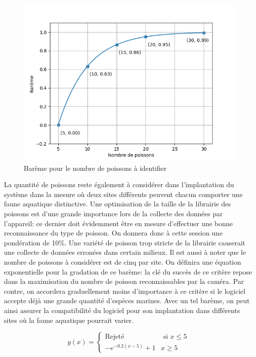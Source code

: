 \begin{figure}[!htb]
    \centering
    \includegraphics[width=0.9\linewidth]{fig/bareme_identification.png}
    \caption{Barème pour le nombre de poissons à identifier}
    \label{fig:bareme_identification}
\end{figure}

La quantité de poissons reste également à considérer dans l'implantation du système dans la mesure où deux sites différents peuvent chacun comporter une faune aquatique distinctive. Une optimisation de la taille de la librairie des poissons est d'une grande importance lors de la collecte des données par l'appareil: ce dernier doit évidemment être en mesure d'effectuer une bonne reconnaissance du type de poisson. On donnera donc à cette session une pondération de 10\%. Une variété de poisson trop stricte de la librairie causerait une collecte de données erronées dans certain milieux. Il est aussi à noter que le nombre de poissons à considérer est de cinq par site. On définira une équation exponentielle pour la gradation de ce barème: la clé du succès de ce critère repose dans la maximisation du nombre de poisson reconnaissables par la caméra. Par contre, on accordera graduellement moins d'importance à ce critère si le logiciel accepte déjà une grande quantité d'espèces marines. Avec un tel barème, on peut ainsi assurer la compatibilité du logiciel pour son implantation dans différents sites où la faune aquatique pourrait varier.

\begin{equation}
    y(x) = \begin{cases}
        \text{Rejeté} & \text{ si } x \le 5 \\
        -e^{-0.2(x-5)} + 1 & x \geq 5
    \end{cases}
    \label{eq:bareme_identification}
\end{equation}


